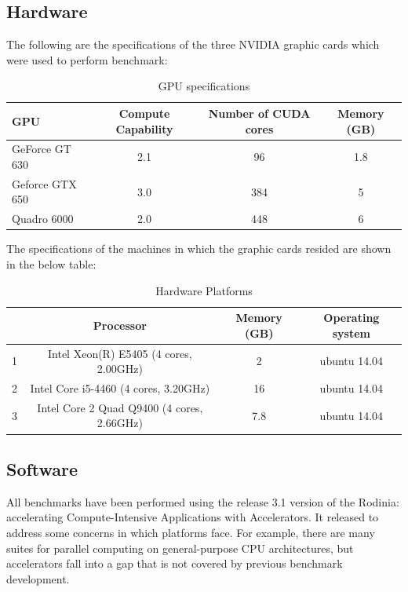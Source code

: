 \documentclass[paper=a4, fontsize=11pt]{scrartcl}
\numberwithin{equation}{section}		%
\numberwithin{figure}{section}			%
\numberwithin{table}{section}				%
\begin{document}
\subsection{Hardware}
The following are the specifications of the three NVIDIA graphic cards which were used to perform benchmark:

\begin{table}[!h]
\caption{GPU specifications}
\centering
\begin{tabular}{|l| c| c| c|}
	\hline
	GPU & Compute Capability & Number of CUDA cores & Memory (GB)\\
	\hline
    GeForce GT 630 & 2.1 & 96 & 1.8  \\
	\hline
    Geforce GTX 650 & 3.0 & 384 & 5 \\
	\hline
    Quadro 6000 & 2.0 & 448 & 6 \\
	\hline
\end{tabular}
\label{table1}
\end{table}

The specifications of the machines in which the graphic cards resided are shown in the below table:

\begin{table}
\caption{Hardware Platforms}
\centering
\begin{tabular}{| c| c| c| c|}
	\hline
	  & Processor & Memory (GB)& Operating system\\
	\hline
    1  & Intel Xeon(R) E5405 (4 cores, 2.00GHz) & 2& ubuntu 14.04 \\
	\hline
    2  & Intel Core i5-4460 (4 cores, 3.20GHz) & 16 & ubuntu 14.04 \\
	\hline
    3  & Intel Core 2 Quad Q9400 (4 cores, 2.66GHz) & 7.8& ubuntu 14.04 \\
	\hline
\end{tabular}
\label{table2}
\end{table}

\subsection{Software}
All benchmarks have been performed using the release 3.1 version of the Rodinia: accelerating Compute-Intensive Applications with Accelerators. It released to address some concerns in  which platforms face. For example, there are many suites for parallel computing on general-purpose CPU architectures, but accelerators fall into a gap that is not covered by previous benchmark development.

\newpage
\clearpage
\end{document}
